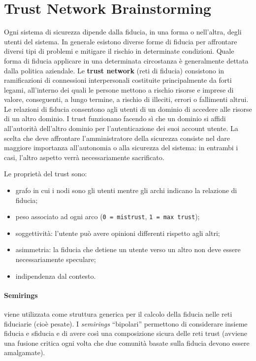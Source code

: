 \section{Trust Network Brainstorming}

Ogni sistema di sicurezza dipende dalla fiducia, in una forma o nell'altra,
degli utenti del sistema. In
generale esistono diverse forme di fiducia per affrontare diversi tipi di problemi
e mitigare il rischio
in determinate condizioni. Quale forma di fiducia applicare in una determinata
circostanza è generalmente dettata dalla politica aziendale.
Le \textbf{trust network} (reti di fiducia) consistono in ramificazioni di
connessioni interpersonali costituite principalmente da forti legami,
all'interno dei quali le persone mettono a rischio risorse e imprese di
valore, conseguenti, a lungo termine, a rischio di illeciti, errori o fallimenti
altrui.
Le relazioni di fiducia consentono agli utenti di un dominio di accedere alle
risorse di un altro dominio. I trust funzionano facendo sì che un dominio si
affidi all'autorità dell'altro dominio per
l'autenticazione dei suoi account utente.
La scelta che deve affrontare l'amministratore della sicurezza consiste nel
dare maggiore importanza all'autonomia o alla sicurezza del sistema:
in entrambi i casi, l'altro aspetto verrà necessariamente sacrificato.

Le proprietà del trust sono:

\begin{itemize}
    \item grafo in cui i nodi sono gli utenti mentre gli archi indicano la
          relazione di fiducia;
    \item peso associato ad ogni arco (\verb|0 = mistrust|, \verb|1 = max trust|);
    \item soggettività: l'utente può avere opinioni differenti rispetto agli altri;
    \item asimmetria: la fiducia che detiene un utente verso un altro non
          deve essere
          necessariamente speculare;
    \item indipendenza dal contesto.
\end{itemize}

\paragraph{Semirings}
viene utilizzata come struttura generica per il calcolo della
fiducia nelle reti fiduciarie (cioè pesate). I \textit{semirings} “bipolari”
permettono di considerare insieme fiducia e sfiducia e di avere
così una composizione sicura delle reti trust
(avviene una fusione critica ogni volta che due comunità basate sulla fiducia
devono essere amalgamate).
